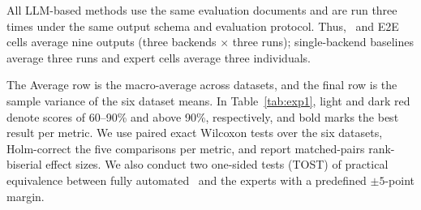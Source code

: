 All LLM-based methods use the same evaluation documents and are run three
times under the same output schema and evaluation protocol. Thus, \ourtool\ and
E2E cells average nine outputs (three backends $\times$ three runs);
single-backend baselines average three runs and expert cells average three
individuals.

The Average row is the macro-average across datasets, and the
final row is the sample variance of the six dataset means. In
Table~\ref{tab:exp1}, light and dark red denote scores of 60--90\% and above
90\%, respectively, and bold marks the best result per metric. We use paired
exact Wilcoxon tests over the six datasets, Holm-correct the five comparisons
per metric, and report matched-pairs rank-biserial effect sizes. We also conduct
two one-sided tests (TOST) of practical equivalence between fully automated
\ourtool\ and the experts with a predefined $\pm5$-point margin.



